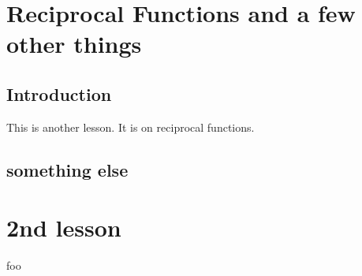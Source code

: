 \documentclass[12pt,letterpaper]{memoir}
\newcommand{\myUnitTitle}{}
\let\oldpart\part
\renewcommand{\part}[1]{
    \renewcommand{\myUnitTitle}{#1}
    \oldpart{#1}
}
\renewcommand{\myUnitTitle}{#2}
\begin{document}
\checkandfixthelayout
\forOL

\pagestyle{myPagestyle}

\frontmatter

\mainmatter




\chapter{Reciprocal Functions and a few other things}

\section{Introduction}
This is another lesson. It is on reciprocal functions.

\section{something else}
\Blindtext

\chapter{2nd lesson}
foo
\end{document}
